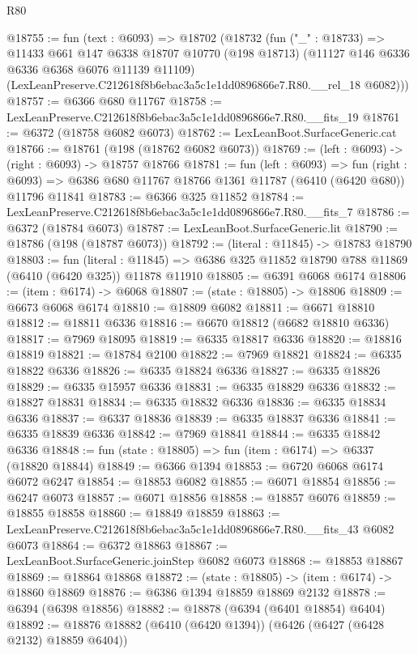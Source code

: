 \begin{lexlean}{R80}
\begin{coremodule}
@18755 := fun (text : @6093) =>
  @18702
    (@18732
      (fun ("_" : @18733) =>
      @11433
        @661
        @147
        @6338
        @18707
        @10770
        (@198 @18713)
        (@11127 @146 @6336 @6336 @6368 @6076 @11139 @11109)
        (LexLeanPreserve.C212618f8b6ebac3a5c1e1dd0896866e7.R80.__rel_18 @6082)))
@18757 := @6366 @680 @11767
@18758 := LexLeanPreserve.C212618f8b6ebac3a5c1e1dd0896866e7.R80.__fits_19
@18761 := @6372 (@18758 @6082 @6073)
@18762 := LexLeanBoot.SurfaceGeneric.cat
@18766 := @18761 (@198 (@18762 @6082 @6073))
@18769 := (left : @6093) -> (right : @6093) -> @18757 @18766
@18781 := fun (left : @6093) =>
  fun (right : @6093) => @6386 @680 @11767 @18766 @1361 @11787 (@6410 (@6420 @680)) @11796 @11841
@18783 := @6366 @325 @11852
@18784 := LexLeanPreserve.C212618f8b6ebac3a5c1e1dd0896866e7.R80.__fits_7
@18786 := @6372 (@18784 @6073)
@18787 := LexLeanBoot.SurfaceGeneric.lit
@18790 := @18786 (@198 (@18787 @6073))
@18792 := (literal : @11845) -> @18783 @18790
@18803 := fun (literal : @11845) =>
  @6386 @325 @11852 @18790 @788 @11869 (@6410 (@6420 @325)) @11878 @11910
@18805 := @6391 @6068 @6174
@18806 := (item : @6174) -> @6068
@18807 := (state : @18805) -> @18806
@18809 := @6673 @6068 @6174
@18810 := @18809 @6082
@18811 := @6671 @18810
@18812 := @18811 @6336
@18816 := @6670 @18812 (@6682 @18810 @6336)
@18817 := @7969 @18095
@18819 := @6335 @18817 @6336
@18820 := @18816 @18819
@18821 := @18784 @2100
@18822 := @7969 @18821
@18824 := @6335 @18822 @6336
@18826 := @6335 @18824 @6336
@18827 := @6335 @18826
@18829 := @6335 @15957 @6336
@18831 := @6335 @18829 @6336
@18832 := @18827 @18831
@18834 := @6335 @18832 @6336
@18836 := @6335 @18834 @6336
@18837 := @6337 @18836
@18839 := @6335 @18837 @6336
@18841 := @6335 @18839 @6336
@18842 := @7969 @18841
@18844 := @6335 @18842 @6336
@18848 := fun (state : @18805) => fun (item : @6174) => @6337 (@18820 @18844)
@18849 := @6366 @1394
@18853 := @6720 @6068 @6174 @6072 @6247
@18854 := @18853 @6082
@18855 := @6071 @18854
@18856 := @6247 @6073
@18857 := @6071 @18856
@18858 := @18857 @6076
@18859 := @18855 @18858
@18860 := @18849 @18859
@18863 := LexLeanPreserve.C212618f8b6ebac3a5c1e1dd0896866e7.R80.__fits_43 @6082 @6073
@18864 := @6372 @18863
@18867 := LexLeanBoot.SurfaceGeneric.joinStep @6082 @6073
@18868 := @18853 @18867
@18869 := @18864 @18868
@18872 := (state : @18805) -> (item : @6174) -> @18860 @18869
@18876 := @6386 @1394 @18859 @18869 @2132
@18878 := @6394 (@6398 @18856)
@18882 := @18878 (@6394 (@6401 @18854) @6404)
@18892 := @18876 @18882 (@6410 (@6420 @1394)) (@6426 (@6427 (@6428 @2132) @18859 @6404))

\end{coremodule}
\end{lexlean}
